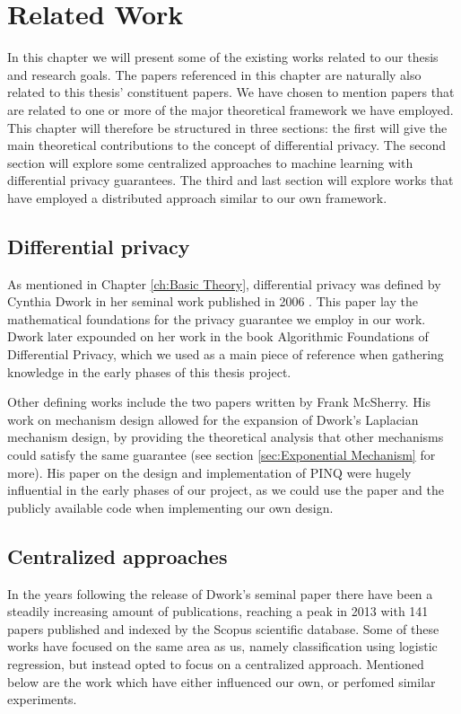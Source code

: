 
\chapter{Related Work} \label{ch:Related Work}

In this chapter we will present some of the existing works related to our thesis and research goals. The papers referenced in this chapter are naturally also related to this thesis' constituent papers. We have chosen to mention papers that are related to one or more of the major theoretical framework we have employed. This chapter will therefore be structured in three sections: the first will give the main theoretical contributions to the concept of differential privacy. The second section will explore some centralized approaches to machine learning with differential privacy guarantees. The third and last section will explore works that have employed a distributed approach similar to our own framework.   

\section{Differential privacy}
As mentioned in Chapter \ref{ch:Basic Theory}, differential privacy was defined by Cynthia Dwork in her seminal work published in 2006 \citep{Dwork06differentialprivacy}. This paper lay the mathematical foundations for the privacy guarantee we employ in our work. Dwork later expounded on her work in the book Algorithmic Foundations of Differential Privacy\citep{dwork2013algorithmic}, which we used as a main piece of reference when gathering knowledge in the early phases of this thesis project.

Other defining works include the two papers written by Frank McSherry. His work on mechanism design \citep{mcsherry2007} allowed for the expansion of Dwork's Laplacian mechanism design, by providing the theoretical analysis that other mechanisms could satisfy the same guarantee (see section \ref{sec:Exponential Mechanism} for more). His paper \citep{mcsherry2009PINQ} on the design and implementation of PINQ were hugely influential in the early phases of our project, as we could use the paper and the publicly available code when implementing our own design. 

\section{Centralized approaches}
In the years following the release of Dwork's seminal paper there have been a steadily increasing amount of publications, reaching a peak in 2013 with 141 papers published and indexed by the Scopus scientific database. Some of these works have focused on the same area as us, namely classification using logistic regression, but instead opted to focus on a centralized approach. Mentioned below are the work which have either influenced our own, or perfomed similar experiments. 

